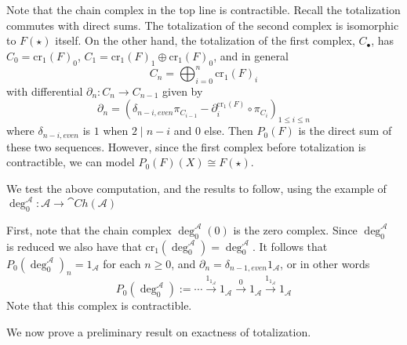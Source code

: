 Note that the chain complex in the top line is contractible. Recall the totalization commutes with direct sums. The totalization of the second complex is isomorphic to $F(\star)$ itself. On the other hand, the totalization of the first complex, $C_\bullet$, has $C_0 = \text{cr}_1(F)_0$, $C_1 = \text{cr}_1(F)_1\oplus \text{cr}_1(F)_0$, and in general
\begin{equation*}
    C_n = \bigoplus_{i=0}^n\text{cr}_1(F)_i
\end{equation*}
with differential $\partial_n:C_n\rightarrow C_{n-1}$ given by 
\begin{equation*}
    \partial_n = (\delta_{n-i,even}\pi_{C_{i-1}}-\partial_i^{\text{cr}_1(F)}\circ \pi_{C_i})_{1\leq i \leq n}
\end{equation*}
where $\delta_{n-i,even}$ is $1$ when $2\mid n-i$ and $0$ else. Then $P_0(F)$ is the direct sum of these two sequences. However, since the first complex before totalization is contractible, we can model $P_0(F)(X) \cong F(\star)$.

We test the above computation, and the results to follow, using the example of $\deg_0^\mathcal{A}:\mathcal{A}\rightarrow \cat{Ch}(\mathcal{A})$

\begin{eg}{}
    First, note that the chain complex $\deg_0^\mathcal{A}(0)$ is the zero complex. Since $\deg_0^\mathcal{A}$ is reduced we also have that $\text{cr}_1(\deg_0^\mathcal{A}) = \deg_0^\mathcal{A}$. It follows that $P_0(\deg_0^\mathcal{A})_n = 1_\mathcal{A}$ for each $n \geq 0$, and $\partial_n = \delta_{n-1,even}1_{\mathcal{A}}$, or in other words
    \begin{equation*}
        P_0(\deg_0^\mathcal{A}) := \cdots \xrightarrow{1_{1_\mathcal{A}}} 1_\mathcal{A}\xrightarrow{0} 1_\mathcal{A}\xrightarrow{1_{1_\mathcal{A}}} 1_\mathcal{A}
    \end{equation*}
    Note that this complex is contractible.
\end{eg}

We now prove a preliminary result on exactness of totalization.

